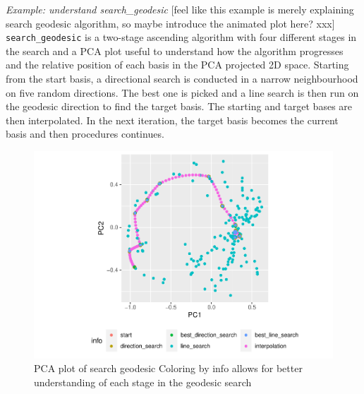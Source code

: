 \documentclass[12pt]{article}
\begin{document}
\emph{Example: understand search\_geodesic} {[}feel like this example is
merely explaining search geodesic algorithm, so maybe introduce the
animated plot here? xxx{]} \texttt{search\_geodesic} is a two-stage
ascending algorithm with four different stages in the search and a PCA
plot useful to understand how the algorithm progresses and the relative
position of each basis in the PCA projected 2D space. Starting from the
start basis, a directional search is conducted in a narrow neighbourhood
on five random directions. The best one is picked and a line search is
then run on the geodesic direction to find the target basis. The
starting and target bases are then interpolated. In the next iteration,
the target basis becomes the current basis and then procedures
continues.

\begin{figure}
\centering
\includegraphics{paper_files/figure-latex/pca-1.pdf}
\caption{\label{pca}PCA plot of search geodesic Coloring by info allows
for better understanding of each stage in the geodesic search}
\end{figure}
\end{document}
